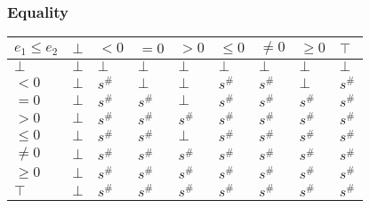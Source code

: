 \documentclass{beamer}
\begin{document}
                        \begin{frame}
                            \frametitle{Equality}
                        \begin{table}[]
                            \begin{tabular}{|l|l|l|l|l|l|l|l|l|}
                            \hline
                            $e_1 \le e_2$ & $\bot$ & $<0$   & $=0$   & $>0$   & $\le 0$ & $\ne 0$ & $\ge 0$ & $\top$ \\ \hline
                            $\bot$        & $\bot$ & $\bot$ & $\bot$ & $\bot$ & $\bot$  & $\bot$  & $\bot$  & $\bot$ \\ \hline
                            $<0$          & $\bot$ & $s^\#$ & $\bot$ & $\bot$ & $s^\#$  & $s^\#$  & $\bot$  & $s^\#$ \\ \hline
                            $=0$          & $\bot$ & $s^\#$ & $s^\#$ & $\bot$ & $s^\#$  & $s^\#$  & $s^\#$  & $s^\#$ \\ \hline
                            $>0$          & $\bot$ & $s^\#$ & $s^\#$ & $s^\#$ & $s^\#$  & $s^\#$  & $s^\#$  & $s^\#$ \\ \hline
                            $\le 0$       & $\bot$ & $s^\#$ & $s^\#$ & $\bot$ & $s^\#$  & $s^\#$  & $s^\#$  & $s^\#$ \\ \hline
                            $\ne 0$       & $\bot$ & $s^\#$ & $s^\#$ & $s^\#$ & $s^\#$  & $s^\#$  & $s^\#$  & $s^\#$ \\ \hline
                            $\ge 0$       & $\bot$ & $s^\#$ & $s^\#$ & $s^\#$ & $s^\#$  & $s^\#$  & $s^\#$  & $s^\#$ \\ \hline
                            $\top$        & $\bot$ & $s^\#$ & $s^\#$ & $s^\#$ & $s^\#$  & $s^\#$  & $s^\#$  & $s^\#$ \\ \hline
                            \end{tabular}
                            \end{table}
                        \end{frame}
\end{document}
